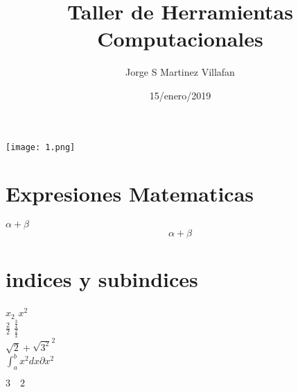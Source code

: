 \documentclass[letterpaper, 12pt, oneside]{article}%
\title{\Huge Taller de Herramientas Computacionales}
\author{Jorge S Martinez Villafan}
\date{15/enero/2019}
\begin{document}
	\maketitle
	\begin{center}
	\texttt{[image: 1.png]}
	
	\end{center}
\newpage
\section*{Expresiones Matematicas}
$\alpha + \beta$ \\ %
\[\alpha + \beta\]

\section*{indices y subindices}
$x_{2}$
$x^{2}$ \\
$\frac{2}{2}$
$\frac{\frac{3}{4}}{\frac{2}{3}}$\\

$\sqrt{2} + \sqrt{3^2}^2$\\

$\int_{a}^{b}x^2 dx \partial x^2$

$3 \quad 2$
	
\end{document}
